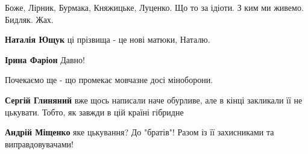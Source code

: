 \begin{itemize}
Боже, Лірник, Бурмака, Княжицьке, Луценко. Що то за ідіоти. З ким ми живемо. Бидляк. Жах.

\begin{itemize}
 
\textbf{Наталія Ющук} ці прізвища - це нові матюки, Наталю.

 
\textbf{Ірина Фаріон} Давно!
\end{itemize}

 
Почекаємо ще - що промекає мовчазне досі міноборони.

\begin{itemize}
 
\textbf{Сергій Глиняний} вже щось написали наче обурливе, але в кінці закликали її не цькувати. Тобто, як завжди в цій країні гібридне

 
\textbf{Андрій Міщенко} яке цькування? До "братів"! Разом із її захисниками та виправдовувачами!
\end{itemize}

 

\end{itemize}
